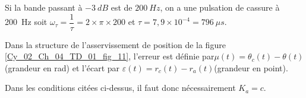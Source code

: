 \ifprof
\begin{corrige}
Si la bande passant à $-\SI{3}{dB}$ est de $\SI{200}{Hz}$, on a une pulsation de cassure à \SI{200}{Hz} soit $\omega_{\tau}=\dfrac{1}{\tau} = 2\times \pi \times 200$ et $\tau = 7,9\times 10^{-4}= \SI{796}{\mu s}$.
\end{corrige}
\else
\fi

Dans la structure de l’asservissement de position de la figure \ref{Cy_02_Ch_04_TD_01_fig_11}, l’erreur est définie par$\mu(t)=\theta_c(t) - \theta(t)$ (grandeur en rad) et l’écart par $\varepsilon(t) = r_c(t)-r_a(t)$(grandeur en point).

\ifprof
\begin{corrige}
Dans les conditions citées ci-dessus, il faut donc nécessairement $K_a = c$. 
\end{corrige}
\else
\fi

